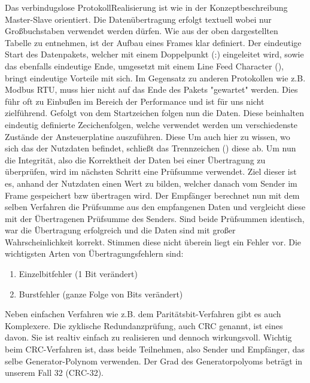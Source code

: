 Das verbindugslose ProtokollRealisierung ist wie in der Konzeptbeschreibung Master-Slave orientiert. Die Datenübertragung erfolgt textuell wobei nur Großbuchstaben verwendet werden dürfen.\newline\newline
Wie aus der oben dargestellten Tabelle zu entnehmen, ist der Aufbau eines Frames klar definiert. Der eindeutige Start des Datenpakets, welcher mit einem Doppelpunkt (:) eingeleitet wird, sowie das ebenfalls eindeutige Ende, umgesetzt mit einem Line Feed Character (),
bringt eindeutige Vorteile mit sich. Im Gegensatz zu anderen Protokollen wie z.B. Modbus RTU, muss hier nicht auf das Ende des Pakets "gewartet" werden. Dies führ oft zu Einbußen im Bereich der Performance und ist für uns nicht zielführend.\newline\newline
Gefolgt von dem Startzeichen folgen nun die Daten. Diese beinhalten eindeutig definierte Zecichenfolgen, welche verwendet werden um verschiedenste Zustände der Ansteuerplatine auszuführen. Diese Um auch hier zu wissen, wo sich das der Nutzdaten befindet, schließt das Trennzeichen () diese ab.\newline\newline
Um nun die Integrität, also die Korrektheit der Daten bei einer Übertragung zu überprüfen, wird im nächsten Schritt eine Prüfsumme verwendet. Ziel dieser ist es, anhand der Nutzdaten einen Wert zu bilden, welcher danach vom Sender im Frame gespeichert bzw übertragen wird.
Der Empfänger berechnet nun mit dem selben Verfahren die Prüfsumme aus den empfangenen Daten und vergleicht diese mit der Übertragenen Prüfsumme des Senders. Sind beide Prüfsummen identisch, war die Übertragung erfolgreich und die Daten sind mit großer Wahrscheinlichkeit korrekt.
Stimmen diese nicht überein liegt ein Fehler vor. Die wichtigsten Arten von Übertragungsfehlern sind:
\begin{enumerate}
    \item Einzelbitfehler (1 Bit verändert)
    \item Burstfehler (ganze Folge von Bits verändert)
\end{enumerate}

Neben einfachen Verfahren wie z.B. dem Paritätsbit-Verfahren gibt es auch Komplexere. Die zyklische Redundanzprüfung, auch CRC genannt, ist eines davon. Sie ist realtiv einfach zu realisieren und dennoch wirkungsvoll.
Wichtig beim CRC-Verfahren ist, dass beide Teilnehmen, also Sender und Empfänger, das selbe Generator-Polynom verwenden. Der Grad des Generatorpolyoms beträgt in unserem Fall 32 (CRC-32).

